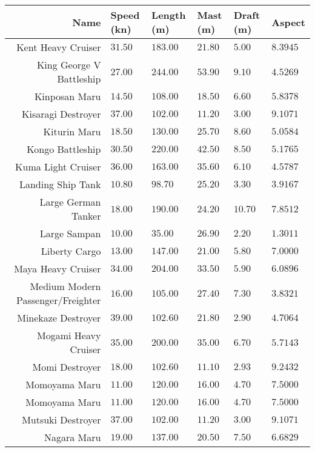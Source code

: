 \begin{tabularx}{\textwidth}{|r|l|l|l|l|X|}
\hline
\textbf{Name} & \textbf{Speed (kn)} & \textbf{Length (m)} & \textbf{Mast (m)} & \textbf{Draft (m)} & \textbf{Aspect}\\
\hline
Kent Heavy Cruiser & $31.50$ & $183.00$ & $21.80$ & $5.00$ & $8.3945$ \\
\hline
King George V Battleship & $27.00$ & $244.00$ & $53.90$ & $9.10$ & $4.5269$ \\
\hline
Kinposan Maru & $14.50$ & $108.00$ & $18.50$ & $6.60$ & $5.8378$ \\
\hline
Kisaragi Destroyer & $37.00$ & $102.00$ & $11.20$ & $3.00$ & $9.1071$ \\
\hline
Kiturin Maru & $18.50$ & $130.00$ & $25.70$ & $8.60$ & $5.0584$ \\
\hline
Kongo Battleship & $30.50$ & $220.00$ & $42.50$ & $8.50$ & $5.1765$ \\
\hline
Kuma Light Cruiser & $36.00$ & $163.00$ & $35.60$ & $6.10$ & $4.5787$ \\
\hline
Landing Ship Tank & $10.80$ & $98.70$ & $25.20$ & $3.30$ & $3.9167$ \\
\hline
Large German Tanker & $18.00$ & $190.00$ & $24.20$ & $10.70$ & $7.8512$ \\
\hline
Large Sampan & $10.00$ & $35.00$ & $26.90$ & $2.20$ & $1.3011$ \\
\hline
Liberty Cargo & $13.00$ & $147.00$ & $21.00$ & $5.80$ & $7.0000$ \\
\hline
Maya Heavy Cruiser & $34.00$ & $204.00$ & $33.50$ & $5.90$ & $6.0896$ \\
\hline
Medium Modern Passenger/Freighter & $16.00$ & $105.00$ & $27.40$ & $7.30$ & $3.8321$ \\
\hline
Minekaze Destroyer & $39.00$ & $102.60$ & $21.80$ & $2.90$ & $4.7064$ \\
\hline
Mogami Heavy Cruiser & $35.00$ & $200.00$ & $35.00$ & $6.70$ & $5.7143$ \\
\hline
Momi Destroyer & $18.00$ & $102.60$ & $11.10$ & $2.93$ & $9.2432$ \\
\hline
Momoyama Maru & $11.00$ & $120.00$ & $16.00$ & $4.70$ & $7.5000$ \\
\hline
Momoyama Maru & $11.00$ & $120.00$ & $16.00$ & $4.70$ & $7.5000$ \\
\hline
Mutsuki Destroyer & $37.00$ & $102.00$ & $11.20$ & $3.00$ & $9.1071$ \\
\hline
Nagara Maru & $19.00$ & $137.00$ & $20.50$ & $7.50$ & $6.6829$ \\

\end{tabularx}
